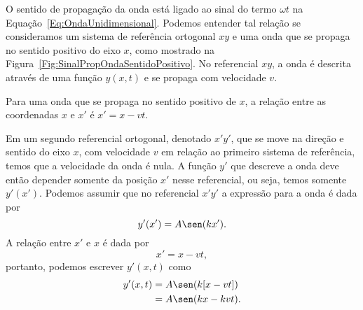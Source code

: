 O sentido de propagação da onda está ligado ao sinal do termo $\omega t$ na Equação~\eqref{Eq:OndaUnidimensional}. Podemos entender tal relação se consideramos um sistema de referência ortogonal $xy$ e uma onda que se propaga no sentido positivo do eixo $x$, como mostrado na Figura~\ref{Fig:SinalPropOndaSentidoPositivo}. No referencial $xy$, a onda é descrita através de uma função $y(x,t)$ e se propaga com velocidade $v$.

\begin{marginfigure}[2cm]
\centering
{}
\caption{Para uma onda que se propaga no sentido positivo de $x$, a relação entre as coordenadas $x$ e $x'$ é $x' = x - vt$.\label{Fig:SinalPropOndaSentidoPositivo}}
\end{marginfigure}

Em um segundo referencial ortogonal, denotado $x'y'$, que se move na direção e sentido do eixo $x$, com velocidade $v$ em relação ao primeiro sistema de referência, temos que a velocidade da onda é nula. A função $y'$ que descreve a onda deve então depender somente da posição $x'$ nesse referencial, ou seja, temos somente $y'(x')$. Podemos assumir que no referencial $x'y'$ a expressão para a onda é dada por
\begin{equation}
    y'(x') = A\sen(kx').
\end{equation}
%
A relação entre $x'$ e $x$ é dada por
\begin{equation}
    x' = x - vt,
\end{equation}
%
portanto, podemos escrever $y'(x,t)$ como
\begin{align}
    y'(x,t) &= A\sen(k[x - vt]) \\
    &= A\sen(kx - kvt).
\end{align}    

